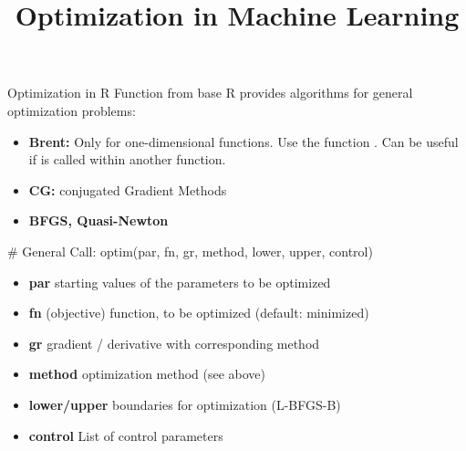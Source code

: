 \documentclass[11pt,compress,t,notes=noshow, xcolor=table]{beamer}
\title{Optimization in Machine Learning}
\date{}
\begin{document}
\sloppy

\begin{vbframe}{Optimization in R}
Function  from base R provides algorithms for general optimization problems: \\[0.15cm]
\begin{itemize}
\item \textbf{Brent:} Only for one-dimensional functions. Use the function .
      Can be useful if  is called within another function.
\item \textbf{CG:} conjugated Gradient Methods
\item \textbf{BFGS, Quasi-Newton}
\end{itemize}
\framebreak
\lz

\begin{verbbox}
# General Call:
optim(par, fn, gr, method, lower, upper, control)
\end{verbbox}
\col

\lz
\begin{itemize}
\item \textbf{par} starting values of the parameters to be optimized
\item \textbf{fn} (objective) function, to be optimized (default: minimized)
\item \textbf{gr} gradient / derivative with corresponding method
\item \textbf{method} optimization method (see above)
\item \textbf{lower/upper} boundaries for optimization (L-BFGS-B)
\item \textbf{control} List of control parameters
\end{itemize}
\end{vbframe}

\endlecture
\end{document}
